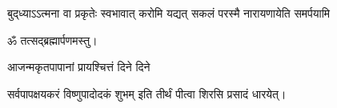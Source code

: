 \begin{center}
{बुद्‌ध्याऽऽत्मना वा प्रकृतेः स्वभावात्}
{करोमि यद्यत् सकलं परस्मै}
{नारायणायेति समर्पयामि}


ॐ तत्सद्ब्रह्मार्पणमस्तु।\medskip

{आजन्मकृतपापानां प्रायश्चित्तं दिने दिने}

{सर्वपापक्षयकरं विष्णुपादोदकं शुभम्}
 इति तीर्थं पीत्वा शिरसि प्रसादं धारयेत्।

\end{center}
\closesection